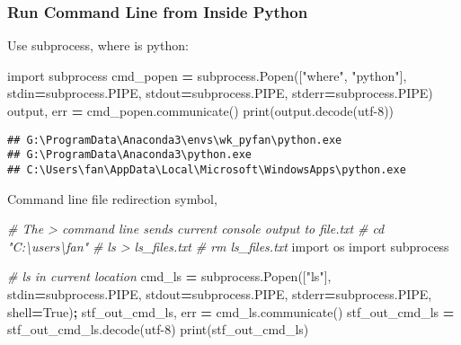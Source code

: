 \documentclass[
]{book}
\newenvironment{Shaded}{\begin{snugshade}}{\end{snugshade}}
\newcommand{\BuiltInTok}[1]{#1}
\newcommand{\CommentTok}[1]{\textcolor[rgb]{0.56,0.35,0.01}{\textit{#1}}}
\newcommand{\ImportTok}[1]{#1}
\newcommand{\NormalTok}[1]{#1}
\newcommand{\OperatorTok}[1]{\textcolor[rgb]{0.81,0.36,0.00}{\textbf{#1}}}
\newcommand{\StringTok}[1]{\textcolor[rgb]{0.31,0.60,0.02}{#1}}
\newcommand{\VariableTok}[1]{\textcolor[rgb]{0.00,0.00,0.00}{#1}}
\begin{document}
\hypertarget{run-command-line-from-inside-python}{%
\subsubsection{Run Command Line from Inside Python}\label{run-command-line-from-inside-python}}

Use subprocess, where is python:

\begin{Shaded}
\begin{Highlighting}[]
\ImportTok{import}\NormalTok{ subprocess}
\NormalTok{cmd\_popen }\OperatorTok{=}\NormalTok{ subprocess.Popen([}\StringTok{"where"}\NormalTok{, }\StringTok{"python"}\NormalTok{],}
\NormalTok{                             stdin}\OperatorTok{=}\NormalTok{subprocess.PIPE,}
\NormalTok{                             stdout}\OperatorTok{=}\NormalTok{subprocess.PIPE,}
\NormalTok{                             stderr}\OperatorTok{=}\NormalTok{subprocess.PIPE)}
\NormalTok{output, err }\OperatorTok{=}\NormalTok{ cmd\_popen.communicate()}
\BuiltInTok{print}\NormalTok{(output.decode(}\StringTok{\textquotesingle{}utf{-}8\textquotesingle{}}\NormalTok{))}
\end{Highlighting}
\end{Shaded}

\begin{verbatim}
## G:\ProgramData\Anaconda3\envs\wk_pyfan\python.exe
## G:\ProgramData\Anaconda3\python.exe
## C:\Users\fan\AppData\Local\Microsoft\WindowsApps\python.exe
\end{verbatim}

Command line file redirection symbol,

\begin{Shaded}
\begin{Highlighting}[]
\CommentTok{\# The \textgreater{} command line sends current console output to file.txt}
\CommentTok{\# cd "C:\textbackslash{}users\textbackslash{}fan"}
\CommentTok{\# ls \textgreater{} ls\_files.txt}
\CommentTok{\# rm ls\_files.txt}
\ImportTok{import}\NormalTok{ os}
\ImportTok{import}\NormalTok{ subprocess}

\CommentTok{\# ls in current location}
\NormalTok{cmd\_ls }\OperatorTok{=}\NormalTok{ subprocess.Popen([}\StringTok{"ls"}\NormalTok{], stdin}\OperatorTok{=}\NormalTok{subprocess.PIPE, stdout}\OperatorTok{=}\NormalTok{subprocess.PIPE, stderr}\OperatorTok{=}\NormalTok{subprocess.PIPE, shell}\OperatorTok{=}\VariableTok{True}\NormalTok{)}\OperatorTok{;}
\NormalTok{stf\_out\_cmd\_ls, err }\OperatorTok{=}\NormalTok{ cmd\_ls.communicate()}
\NormalTok{stf\_out\_cmd\_ls }\OperatorTok{=}\NormalTok{ stf\_out\_cmd\_ls.decode(}\StringTok{\textquotesingle{}utf{-}8\textquotesingle{}}\NormalTok{)}
\BuiltInTok{print}\NormalTok{(stf\_out\_cmd\_ls)}
\end{Highlighting}
\end{Shaded}
\end{document}
